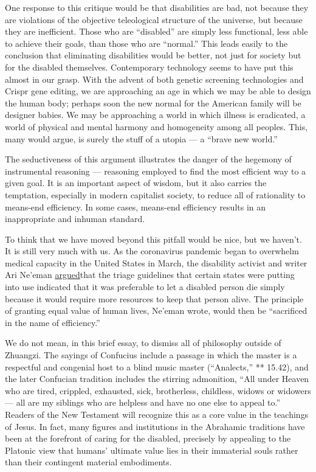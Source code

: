 One response to this critique would be that disabilities are bad, not
because they are violations of the objective teleological structure of
the universe, but because they are inefficient. Those who are
``disabled'' are simply less functional, less able to achieve their
goals, than those who are ``normal.'' This leads easily to the
conclusion that eliminating disabilities would be better, not just for
society but for the disabled themselves. Contemporary technology seems
to have put this almost in our grasp. With the advent of both genetic
screening technologies and Crispr gene editing, we are approaching an
age in which we may be able to design the human body; perhaps soon the
new normal for the American family will be designer babies. We may be
approaching a world in which illness is eradicated, a world of physical
and mental harmony and homogeneity among all peoples. This, many would
argue, is surely the stuff of a utopia --- a ``brave new world.''

The seductiveness of this argument illustrates the danger of the
hegemony of instrumental reasoning --- reasoning employed to find the
most efficient way to a given goal. It is an important aspect of wisdom,
but it also carries the temptation, especially in modern capitalist
society, to reduce all of rationality to means-end efficiency. In some
cases, means-end efficiency results in an inappropriate and inhuman
standard.

To think that we have moved beyond this pitfall would be nice, but we
haven't. It is still very much with us. As the coronavirus pandemic
began to overwhelm medical capacity in the United States in March, the
disability activist and writer Ari Ne'eman
\href{https://www.nytimes3xbfgragh.onion/2020/03/23/opinion/coronavirus-ventilators-triage-disability.html}{argued}that
the triage guidelines that certain states were putting into use
indicated that it was preferable to let a disabled person die simply
because it would require more resources to keep that person alive. The
principle of granting equal value of human lives, Ne'eman wrote, would
then be ``sacrificed in the name of efficiency.''

We do not mean, in this brief essay, to dismiss all of philosophy
outside of Zhuangzi. The sayings of Confucius include a passage in which
the master is a respectful and congenial host to a blind music master
(``Analects,'' ** 15.42), and the later Confucian tradition includes the
stirring admonition, ``All under Heaven who are tired, crippled,
exhausted, sick, brotherless, childless, widows or widowers --- all are
my siblings who are helpless and have no one else to appeal to.''
Readers of the New Testament will recognize this as a core value in the
teachings of Jesus. In fact, many figures and institutions in the
Abrahamic traditions have been at the forefront of caring for the
disabled, precisely by appealing to the Platonic view that humans'
ultimate value lies in their immaterial souls rather than their
contingent material embodiments.

